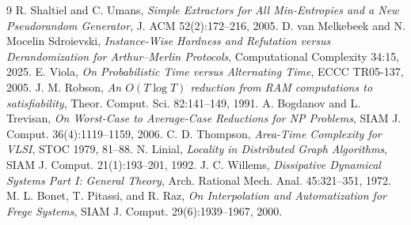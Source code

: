 \documentclass[11pt]{article}
\begin{document}
\begin{thebibliography}{9}
 R. Shaltiel and C. Umans, \emph{Simple Extractors for All Min-Entropies and a New Pseudorandom Generator}, J. ACM 52(2):172--216, 2005.
 D. van Melkebeek and N. Mocelin Sdroievski, \emph{Instance-Wise Hardness and Refutation versus Derandomization for Arthur--Merlin Protocols}, Computational Complexity 34:15, 2025.
 E. Viola, \emph{On Probabilistic Time versus Alternating Time}, ECCC TR05-137, 2005.
 J. M. Robson, \emph{An $O(T\log T)$ reduction from RAM computations to satisfiability}, Theor. Comput. Sci. 82:141--149, 1991.
 A. Bogdanov and L. Trevisan, \emph{On Worst-Case to Average-Case Reductions for NP Problems}, SIAM J. Comput. 36(4):1119--1159, 2006.
 C. D. Thompson, \emph{Area-Time Complexity for VLSI}, STOC 1979, 81--88.
 N. Linial, \emph{Locality in Distributed Graph Algorithms}, SIAM J. Comput. 21(1):193--201, 1992.
 J. C. Willems, \emph{Dissipative Dynamical Systems Part I: General Theory}, Arch. Rational Mech. Anal. 45:321--351, 1972.
 M. L. Bonet, T. Pitassi, and R. Raz, \emph{On Interpolation and Automatization for Frege Systems}, SIAM J. Comput. 29(6):1939--1967, 2000.
\end{thebibliography}
\end{document}
